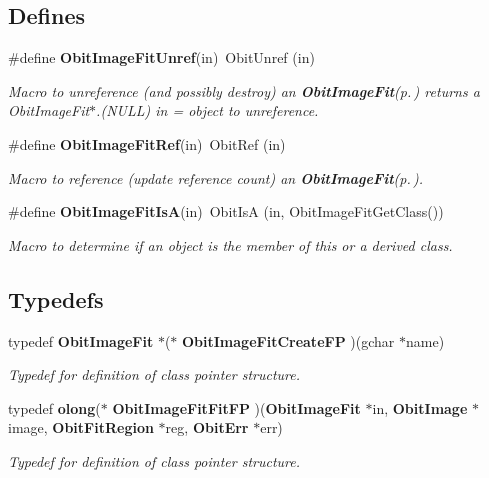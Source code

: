 \subsection*{Defines}
\begin{CompactItemize}
\item 
\#define {\bf Obit\-Image\-Fit\-Unref}(in)\ Obit\-Unref (in)
\begin{CompactList}\small\item\em Macro to unreference (and possibly destroy) an {\bf Obit\-Image\-Fit}{\rm (p.\,\pageref{structObitImageFit})} returns a Obit\-Image\-Fit$\ast$.(NULL) in = object to unreference. \item\end{CompactList}\item 
\#define {\bf Obit\-Image\-Fit\-Ref}(in)\ Obit\-Ref (in)
\begin{CompactList}\small\item\em Macro to reference (update reference count) an {\bf Obit\-Image\-Fit}{\rm (p.\,\pageref{structObitImageFit})}. \item\end{CompactList}\item 
\#define {\bf Obit\-Image\-Fit\-Is\-A}(in)\ Obit\-Is\-A (in, Obit\-Image\-Fit\-Get\-Class())
\begin{CompactList}\small\item\em Macro to determine if an object is the member of this or a derived class. \item\end{CompactList}\end{CompactItemize}
\subsection*{Typedefs}
\begin{CompactItemize}
\item 
typedef {\bf Obit\-Image\-Fit} $\ast$($\ast$ {\bf Obit\-Image\-Fit\-Create\-FP} )(gchar $\ast$name)
\begin{CompactList}\small\item\em Typedef for definition of class pointer structure. \item\end{CompactList}\item 
typedef {\bf olong}($\ast$ {\bf Obit\-Image\-Fit\-Fit\-FP} )({\bf Obit\-Image\-Fit} $\ast$in, {\bf Obit\-Image} $\ast$image, {\bf Obit\-Fit\-Region} $\ast$reg, {\bf Obit\-Err} $\ast$err)
\begin{CompactList}\small\item\em Typedef for definition of class pointer structure. \item\end{CompactList}\end{CompactItemize}
